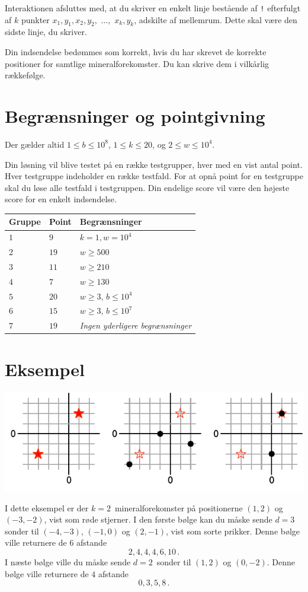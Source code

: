 Interaktionen afsluttes med, at du skriver en enkelt linje bestående af \texttt{!} efterfulgt af $k$ punkter $x_1, y_1, x_2, y_2,$ $\ldots,$ $x_k, y_k$, adskilte af mellemrum.
Dette skal være den sidste linje, du skriver.

Din indsendelse bedømmes som korrekt, hvis du har skrevet de korrekte positioner for samtlige mineralforekomster.
Du kan skrive dem i vilkårlig rækkefølge.


\section*{Begrænsninger  og pointgivning}

Der gælder altid
$1\leq b \leq 10^8$, %
$1 \leq k \leq 20$, %
og
$2 \le w \leq 10^4$. %

Din løsning vil blive testet på en række testgrupper, hver med en vist antal point.
Hver testgruppe indeholder en række testfald.
For at opnå point for en testgruppe skal du løse alle testfald i testgruppen.
Din endelige score vil være den højeste score for en enkelt indsendelse.

\medskip
\begin{tabular}{lll}
Gruppe & Point & Begrænsninger \\\hline
$1$ & $9$ & $k = 1, w = 10^4$\\
$2$ & $19$ & $w \ge 500$\\
$3$ & $11$ & $w \ge 210$\\
$4$ & $7$ & $w \ge 130$\\
$5$ & $20$ & $w \ge 3$, $b \le 10^4$\\
$6$ & $15$ & $w \ge 3$, $b \le 10^7$\\
$7$ & $19$ & \emph{Ingen yderligere begrænsninger}
\end{tabular}

\section*{Eksempel}

\includegraphics[width=.6\textwidth]{img/sample1.pdf}

I dette eksempel er der $k=2$~mineralforekomster på positionerne $(1,2)$ og $(-3,-2)$, vist som røde stjerner.
I den første bølge kan du måske sende $d=3$ sonder til $(-4,-3)$, $(-1, 0)$ og $(2,-1)$, vist som sorte prikker.
Denne bølge ville returnere de $6$ afstande \[
  2, 4, 4, 4, 6, 10\,.
\]
I næste bølge ville du måske sende $d=2$~sonder til $(1,2)$ og $(0,-2)$.
Denne bølge ville returnere de $4$ afstande
\[
  0, 3, 5, 8\,.
\]
